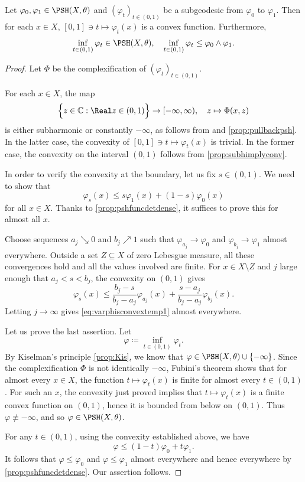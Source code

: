 \begin{proposition}\label{prop:convexsubgeod}
    Let $\varphi_0,\varphi_1\in \PSH(X,\theta)$ and $(\varphi_t)_{t\in (0,1)}$ be a subgeodesic from $\varphi_0$ to $\varphi_1$. Then for each $x\in X$, $[0,1] \ni t\mapsto \varphi_t(x)$ is a convex function. Furthermore,
    \[
    \inf_{t\in (0,1)}\varphi_t\in \PSH(X,\theta),\quad \inf_{t\in (0,1)}\varphi_t\leq \varphi_0\land \varphi_1.
    \]
\end{proposition}


\begin{proof}
    Let $\Phi$ be the complexification of $(\varphi_t)_{t\in (0,1)}$.

    For each $x\in X$, the map
    \[
    \Bigl\{z\in \mathbb{C}: \Real z\in (0,1) \Bigr\}\rightarrow [-\infty,\infty),\quad z\mapsto \Phi(x,z)
    \]
    is either subharmonic or constantly $-\infty$, as follows from  and \cref{prop:pullbackpsh}.
    In the latter case, the convexity of $[0,1] \ni t\mapsto \varphi_t(x)$ is trivial. In the former case, the convexity on the interval $(0,1)$ follows from
    \cref{prop:subhimplyconv}.

    In order to verify the convexity at the boundary, let us fix $s\in (0,1)$. We need to show that
    \begin{equation}\label{eq:varphisconvextemp1}
    \varphi_s(x)\leq s\varphi_1(x)+(1-s)\varphi_0(x)
    \end{equation}
    for all $x\in X$. Thanks to \cref{prop:pshfuncdetdense}, it suffices to prove this for almost all $x$.

    Choose sequences $a_j\searrow0$ and $b_j\nearrow1$ such that $\varphi_{a_j}\to\varphi_0$ and $\varphi_{b_j}\to\varphi_1$ almost everywhere. Outside a set $Z\subseteq X$ of zero Lebesgue measure, all these convergences hold and all the values involved are finite. For $x\in X\setminus Z$ and $j$ large enough that $a_j<s<b_j$, the convexity on $(0,1)$ gives
    \[
    \varphi_s(x)\leq \frac{b_j-s}{b_j-a_j}\varphi_{a_j}(x)+\frac{s-a_j}{b_j-a_j}\varphi_{b_j}(x).
    \]
    Letting $j\to\infty$ gives \eqref{eq:varphisconvextemp1} almost everywhere.

    Let us prove the last assertion. Let
    \[
    \varphi\coloneqq \inf_{t\in (0,1)}\varphi_t.
    \]
    By Kiselman's principle \cref{prop:Kis}, we know that $\varphi\in \PSH(X,\theta)\cup \{-\infty\}$. Since the complexification $\Phi$ is not identically $-\infty$, Fubini's theorem shows that for almost every $x\in X$, the function $t\mapsto \varphi_t(x)$ is finite for almost every $t\in (0,1)$. For such an $x$, the convexity just proved implies that $t\mapsto \varphi_t(x)$ is a finite convex function on $(0,1)$, hence it is bounded from below on $(0,1)$. Thus $\varphi\not\equiv -\infty$, and so $\varphi\in \PSH(X,\theta)$.

    For any $t\in (0,1)$, using the convexity established above, we have
    \[
    \varphi\leq (1-t)\varphi_0+t\varphi_1.
    \]
    It follows that $\varphi\leq \varphi_0$ and $\varphi\leq \varphi_1$ almost everywhere and hence everywhere by \cref{prop:pshfuncdetdense}. Our assertion follows.
\end{proof}

